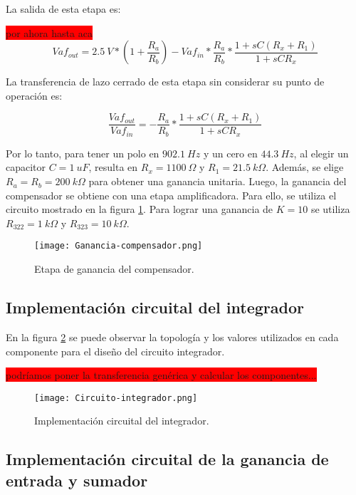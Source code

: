 La salida de esta etapa es:

\colorbox{red}{por ahora hasta aca}
\begin{equation} 
	Vaf_{out}= 2.5\:V* (1+\frac{R_a}{R_b})- Vaf_{in}*\frac{R_a}{R_b}*\frac{1+sC(R_x+R_1)}{1+sCR_x}
\end{equation}

La transferencia de lazo cerrado de esta etapa sin considerar su punto de operación es:

\begin{equation} 
	\frac{Vaf_{out}}{Vaf_{in}}= - \frac{R_a}{R_b}*\frac{1+sC(R_x+R_1)}{1+sCR_x}
\end{equation}

\noindent Por lo tanto, para tener un polo en $902.1\:Hz$ y un cero en $44.3\:Hz$, al elegir un capacitor $C = 1\:uF$, resulta en $R_x = 1100\:\Omega$ y $R_1 = 21.5\:k\Omega$. Además, se elige $R_a = R_b = 200\:k\Omega$ para obtener una ganancia unitaria. Luego, la ganancia del compensador se obtiene con una etapa amplificadora.
Para ello, se utiliza el circuito mostrado en la figura \ref{fig:ganancia-compensador}. Para lograr una ganancia de $K=10$ se utiliza $R_{322} = 1\:k\Omega$ y $R_{323} = 10\:k\Omega$.


\begin{figure}[H]
	\centering
	\texttt{[image: Ganancia-compensador.png]}
	\caption{Etapa de ganancia del compensador.}
	\label{fig:ganancia-compensador}
\end{figure}

\subsection{Implementación circuital del integrador}

\noindent En la figura \ref{fig:circuito-integrador} se puede observar la topología y los valores utilizados en cada componente para el diseño del circuito integrador.

\colorbox{red}{podríamos poner la transferencia genérica y calcular los componentes...} 

\begin{figure}[H]
	\centering
	\texttt{[image: Circuito-integrador.png]}
	\caption{Implementación circuital del integrador.}
	\label{fig:circuito-integrador}
	\end{figure}


\subsection{Implementación circuital de la ganancia de entrada y sumador}


